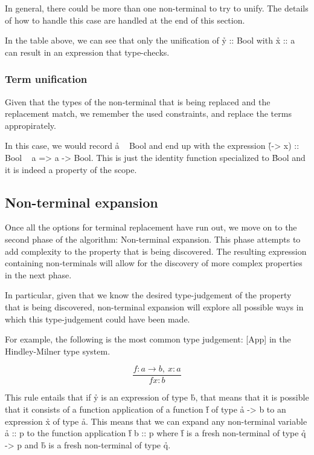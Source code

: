 \documentclass[a4paper, 11pt]{article}
\begin{document}
In general, there could be more than one non-terminal to try to unify.
The details of how to handle this case are handled at the end of this section.

In the table above, we can see that only the unification of \h{y :: Bool} with \h{x :: a} can result in an expression that type-checks.


\subsubsection{Term unification}

Given that the types of the non-terminal that is being replaced and the replacement match, we remember the used constraints, and replace the terms appropirately.

In this case, we would record \h{a ~ Bool} and end up with the expression \h{(\x -> x) :: Bool ~ a => a -> Bool}.
This is just the identity function specialized to \h{Bool} and it is indeed a property of the scope.


\subsection{Non-terminal expansion}

Once all the options for terminal replacement have run out, we move on to the second phase of the algorithm: Non-terminal expansion.
This phase attempts to add complexity to the property that is being discovered.
The resulting expression containing non-terminals will allow for the discovery of more complex properties in the next phase.

In particular, given that we know the desired type-judgement of the property that is being discovered,
non-terminal expansion will explore all possible ways in which this type-judgement could have been made.

For example, the following is the most common type judgement:
[App] in the Hindley-Milner type system. 

\[
  \frac{f : a \rightarrow b,\ x : a}{f x : b}
\]

This rule entails that if \h{y} is an expression of type \h{b}, that means that it is possible that it consists of a function application of a function \h{f} of type \h{a -> b} to an expression \h{x} of type \h{a}.
This means that we can expand any non-terminal variable \h{a :: p} to the function application \h{f b :: p} where \h{f} is a fresh non-terminal of type \h{q -> p} and \h{b} is a fresh non-terminal of type \h{q}.
\end{document}
